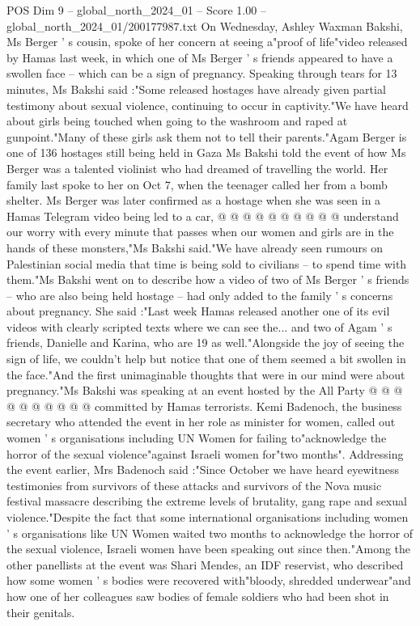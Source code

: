 \begin{textsample}{POS Dim 9 – global\_north\_2024\_01 – Score 1.00 – global\_north\_2024\_01/200177987.txt}  \label{ex:f9_pos_268}
On Wednesday, Ashley Waxman Bakshi, Ms Berger ' s cousin, spoke of her concern at seeing a"proof of life"video released by Hamas last week, in which one of Ms Berger ' s friends appeared to have a swollen face -- which can be a sign of pregnancy.
Speaking through tears for 13 minutes, Ms Bakshi said :"Some released hostages have already given partial testimony about sexual violence, continuing to occur in captivity."We have heard about girls being touched when going to the washroom and raped at gunpoint."Many of these girls ask them not to tell their parents."Agam Berger is one of 136 hostages still being held in Gaza Ms Bakshi told the event of how Ms Berger was a talented violinist who had dreamed of travelling the world.
Her family last spoke to her on Oct 7, when the teenager called her from a bomb shelter.
Ms Berger was later confirmed as a hostage when she was seen in a Hamas Telegram video being led to a car, @ @ @ @ @ @ @ @ @ @ understand our worry with every minute that passes when our women and girls are in the hands of these monsters,"Ms Bakshi said."We have already seen rumours on Palestinian social media that time is being sold to civilians -- to spend time with them."Ms Bakshi went on to describe how a video of two of Ms Berger ' s friends -- who are also being held hostage -- had only added to the family ' s concerns about pregnancy.
She said :"Last week Hamas released another one of its evil videos with clearly scripted texts where we can see the... and two of Agam ' s friends, Danielle and Karina, who are 19 as well."Alongside the joy of seeing the sign of life, we couldn't help but notice that one of them seemed a bit swollen in the face."And the first unimaginable thoughts that were in our mind were about pregnancy."Ms Bakshi was speaking at an event hosted by the All Party @ @ @ @ @ @ @ @ @ @ committed by Hamas terrorists.
Kemi Badenoch, the business secretary who attended the event in her role as minister for women, called out women ' s organisations including UN Women for failing to"acknowledge the horror of the sexual violence"against Israeli women for"two months".
Addressing the event earlier, Mrs Badenoch said :"Since October we have heard eyewitness testimonies from survivors of these attacks and survivors of the Nova music festival massacre describing the extreme levels of brutality, gang rape and sexual violence."Despite the fact that some international organisations including women ' s organisations like UN Women waited two months to acknowledge the horror of the sexual violence, Israeli women have been speaking out since then."Among the other panellists at the event was Shari Mendes, an IDF reservist, who described how some women ' s bodies were recovered with"bloody, shredded underwear"and how one of her colleagues saw bodies of female soldiers who had been shot in their genitals.

\end{textsample}
